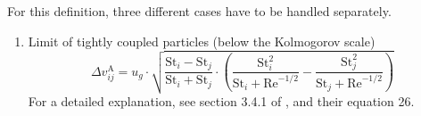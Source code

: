         For this definition, three different cases have to be handled separately.
        \begin{enumerate}
            \item Limit of tightly coupled particles (below the Kolmogorov scale) \\
                \begin{equation}
                    \label{eq:turbulence_ormel_cuzzi_eq_1}
                    \Delta v_{ij}^\text{A}
                    = u_g \cdot \sqrt{
                        \frac{\text{St}_i - \text{St}_j}{\text{St}_i + \text{St}_j} \cdot 
                        \left(
                            \frac{\text{St}_i^2}{\text{St}_i + \text{Re}^{-1/2}} -
                            \frac{\text{St}_j^2}{\text{St}_j + \text{Re}^{-1/2}}
                        \right)
                    }
                \end{equation} 
                For a detailed explanation, see section 3.4.1 of \cite{ormel_cuzzi_2007}, 
                and their equation 26.


\end{enumerate}
